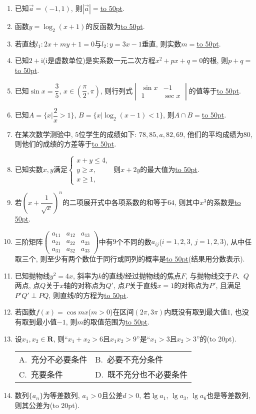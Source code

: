 \documentclass[10pt,a4paper]{article}
\newcommand{\blank}[1]{\underline{\hbox to #1pt{}}}
\newcommand{\bracket}[1]{(\hbox to #1pt{})}
\newcommand{\twoch}[4]{\par\begin{tabular}{p{.46\textwidth}p{.46\textwidth}}
A.~#1& B.~#2\\
C.~#3& D.~#4
\end{tabular}}
\begin{document}
\begin{enumerate}[1.]
\item 已知$\overrightarrow a = (-1,1)$, 则$|\overrightarrow a|=$\blank{50}.
\item 函数$y=\log_2(x+1)$的反函数为\blank{50}.
\item 若直线$l_1:2x+my+1=0$与$l_2:y=3x-1$垂直, 则实数$m=$\blank{50}.
\item 已知$2+\mathrm{i}$($\mathrm{i}$是虚数单位)是实系数一元二次方程$x^2+px+q=0$的根, 则$p+q=$\blank{50}.
\item 已知$\sin x=\dfrac{3}{5}$, $x\in (\dfrac \pi 2,\pi)$, 则行列式$\begin{vmatrix}   \sin x & -1 \\ 1 & \sec x \end{vmatrix}$的值等于\blank{50}.
\item 已知$A=\{x|\dfrac 2 x>1\}$, $B=\{x|\log_2 (x-1)<1\}$, 则$A\cap B=$\blank{50}.
\item 在某次数学测验中, $5$位学生的成绩如下: $78,85,a,82,69$, 他们的平均成绩为$80$, 则他们的成绩的方差等于\blank{50}.
\item 已知实数$x,y$满足$\begin{cases}x+y\le 4, \\ y\ge x, \\ x\ge 1,\end{cases}$ 则$x+2y$的最大值为\blank{50}.
\item 若$(x+\dfrac 1{\sqrt{x}})^n$的二项展开式中各项系数的和等于$64$, 则其中$x^3$的系数是\blank{50}.
\item 三阶矩阵$\begin{pmatrix}
    a_{11} & a_{12} & a_{13} \\ a_{21} & a_{22} & a_{23} \\ a_{31} & a_{32} & a_{33}
\end{pmatrix}$中有$9$个不同的数$a_{ij}$($i=1,2,3$, $j=1,2,3$), 从中任取三个, 则至少有两个数位于同行或同列的概率是\blank{50}(结果用分数表示).
\item 已知抛物线$y^2=4x$, 斜率为$k$的直线$l$经过抛物线的焦点$F$, 与抛物线交于$P$、$Q$两点, 点$Q$关于$x$轴的对称点为$Q'$, 点$P$关于直线$x=1$的对称点为$P'$, 且满足$P'Q'\perp PQ$, 则直线$l$的方程为\blank{50}.
\item 若函数$f(x)=\cos mx$($m>0$)在区间$(2\pi,3\pi)$内既没有取到最大值$1$, 也没有取到最小值$-1$, 则$m$的取值范围为\blank{50}.
\item 设$x_1,x_2\in \mathbf{R}$, 则``$x_1+x_2>6$且$x_1x_2>9$''是``$x_1>3$且$x_2>3$''的\bracket{20}.
\twoch{充分不必要条件}{必要不充分条件}{充要条件}{既不充分也不必要条件}
\item 数列$\{a_n\}$为等差数列, $a_1>0$且公差$d>0$, 若$\lg a_1$, $\lg a_3$, $\lg a_6$也是等差数列, 则其公差为\bracket{20}.

\end{enumerate}
\end{document}
